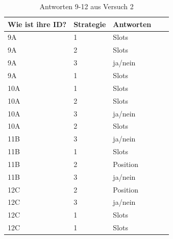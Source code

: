 \documentclass[12pt,a4paper]{scrartcl}
\begin{document}
\begin{appendix}
\begin{table}
\end{table}

\begin{table}
\centering
\caption{Antworten 9-12 aus Versuch 2}
\begin{tabular}{ | l | l | l | l | l | }
\hline
Wie ist ihre ID? & Strategie & Antworten \\ \hline \hline
	9A & 1 & Slots \\ \hline
	9A & 2 & Slots \\ \hline
	9A & 3 & ja/nein \\ \hline
	9A & 1 & Slots \\ \hline \hline 
	10A & 1 & Slots \\ \hline
	10A & 2 & Slots \\ \hline
	10A & 3 & ja/nein \\ \hline
	10A & 2 & Slots \\ \hline \hline 
	11B & 3 & ja/nein \\ \hline
	11B & 1 & Slots \\ \hline
	11B & 2 & Position \\ \hline
	11B & 3 & ja/nein \\ \hline \hline 
	12C & 2 & Position \\ \hline
	12C & 3 & ja/nein \\ \hline
	12C & 1 & Slots \\ \hline
	12C & 1 & Slots \\ \hline

\end{tabular}
\end{table}

\end{appendix}
\cleardoublepage
\end{document}
